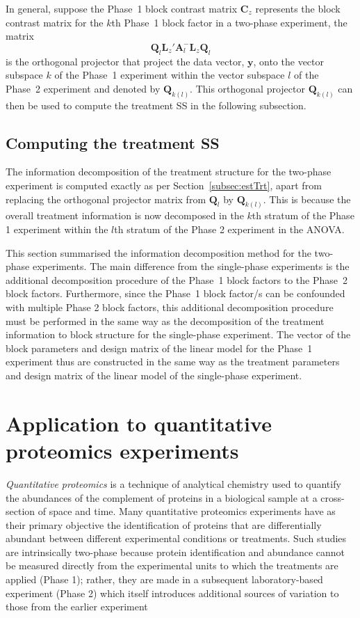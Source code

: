 \documentclass[article]{jss}
\newcommand{\Q}{\mathbf{Q}}
\newcommand{\A}{\mathbf{A}}
\newcommand{\C}{\mathbf{C}}
\newcommand{\mL}{\mathbf{L}}
\begin{document}
In general, suppose the Phase~1 block contrast matrix $\C_z$ represents the block contrast matrix for the $k$th Phase~1 block factor in a two-phase experiment, the matrix 
\[
\Q_l\mL_{z}' \A_{l}^{-} \mL_{z}\Q_l
\]
is the orthogonal projector that project the data vector, $\bm{y}$, onto the vector subspace $k$ of the Phase~1 experiment within the vector subspace $l$ of the Phase~2 experiment and denoted by $\Q_{k(l)}$. This orthogonal projector $\Q_{k(l)}$ can then be used to compute the treatment SS in the following subsection.

\subsection{Computing the treatment SS}
\label{subsec:trtDecomp}
The information decomposition of the treatment structure for the two-phase experiment is computed exactly as per Section~\ref{subsec:estTrt}, apart from replacing the orthogonal projector matrix from $\Q_l$ by $\Q_{k(l)}$. This is because the overall treatment information is now decomposed in the $k$th stratum of the Phase 1 experiment within the $l$th stratum of the Phase 2 experiment in the ANOVA.

This section summarised the information decomposition method for the two-phase experiments. The main difference from the single-phase experiments is the additional decomposition procedure of the Phase~1 block factors to the Phase~2 block factors. Furthermore, since the Phase~1 block factor/s can be confounded with multiple Phase 2 block factors, this additional decomposition procedure must be performed in the same way as the decomposition of the treatment information to block structure for the single-phase experiment. The vector of the block parameters and design matrix of the linear model for the Phase~1 experiment thus are constructed in the same way as the treatment parameters and design matrix of the linear model of the single-phase experiment.  

\section{Application to quantitative proteomics experiments} 
\label{sec:exampleTwoPase}
\emph{Quantitative proteomics} is a technique of analytical chemistry used to quantify the abundances of the complement of proteins in a biological sample at a cross-section of space and time. Many quantitative proteomics experiments have as their primary objective the identification of proteins that are differentially abundant between different experimental conditions or treatments. Such studies are intrinsically two-phase because protein identification and abundance cannot be measured directly from the experimental units to which the treatments are applied (Phase 1); rather, they are made in a subsequent laboratory-based experiment (Phase 2) which itself introduces additional sources of variation to those from the earlier experiment
\end{document}
